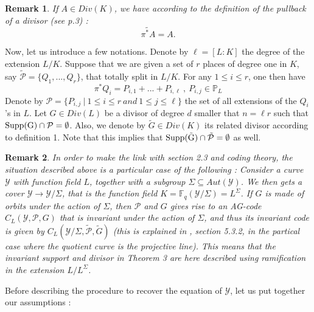 \documentclass[10pt]{article}
\newtheorem{rq1}{Remark}[]
\newcommand{\s}{\vspace{0.3cm}}
\newcommand{\fq}{\mathbb{F}_q}
\newcommand{\su}{\subseteq}
\newcommand{\Y}{\mathcal{Y}}
\newcommand{\PR}{\mathcal{P}}
\begin{document}
\s 

\begin{rq1}
If $A \in Div(K)$, we have according to the definition of the pullback of a divisor (see p.3) :
\[\widetilde{\pi^*A}=A.\]
\end{rq1}

\s

Now, let us introduce a few notations. Denote by $\ell=[L:K]$ the degree of the extension $L/K$. Suppose that we are given a set of $r$ places of degree one in $K$, say $\tilde{\PR} = \{Q_1,...,Q_r\}$, that totally split in $L/K$. For any $1 \leq i \leq r$, one then have 
\[\pi^*Q_i = P_{i,1} + ... + P_{i,\ell} \ , \ P_{i,j} \in \mathbb{P}_L\]
Denote by $\PR = \{P_{i,j} \ | \ 1 \leq i \leq r \ and \ 1 \leq j \leq \ell\}$ the set of all extensions of the $Q_i$'s in $L$. Let $G \in Div(L)$ be a divisor of degree $d$ smaller that $n=\ell r$ such that $\rm{Supp}(G) \cap \PR = \emptyset$. Also, we denote by $\tilde{G} \in Div(K)$ its related divisor according to definition 1.
Note that this implies that $\rm{Supp}(\tilde{G}) \cap \tilde{\PR} = \emptyset$ as well. 

\s

\begin{rq1} \rm
In order to make the link with section 2.3 and coding theory, the situation described above is a particular case of the following : Consider a curve $\Y$ with function field $L$, together with a subgroup $\Sigma \su Aut(\Y)$. We then gets a cover $\Y \rightarrow \Y/\Sigma$, that is the function field $K = \fq(\Y/\Sigma) = L^{\Sigma}$. If $G$ is made of orbits under the action of $\Sigma$, then $\PR$ and $G$ gives rise to an AG-code $C_L(\Y,\PR,G)$ that is invariant under the action of $\Sigma$, and thus its invariant code is given by $C_L(\Y/\Sigma,\tilde{\PR},\tilde{G})$ (this is explained in \cite{Bar}, section 5.3.2, in the partical case where the quotient curve is the projective line). This means that the invariant support and divisor in Theorem 3 are here described using ramification in the extension $L/L^{\Sigma}$. 
\end{rq1}

\s

Before describing the procedure to recover the equation of $\Y$, let us put together our assumptions :
\end{document}
